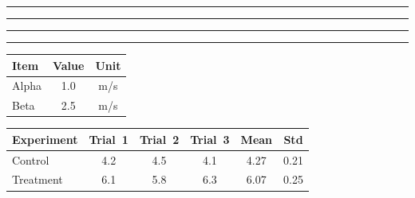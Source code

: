 \documentclass[twocolumn]{article}
\begin{document}
\begin{absfigure}[page=4, pos=t, col=1]
  \centering
  \rule{0.9\columnwidth}{2cm}
  \caption{Top stack A (defined first) --- page~4, col~1}
  \label{fig:topA}
\end{absfigure}

\begin{absfigure}[page=4, pos=t, col=1]
  \centering
  \rule{0.9\columnwidth}{1.5cm}
  \caption{Top stack B (defined second) --- page~4, col~1}
  \label{fig:topB}
\end{absfigure}

\begin{absfigure*}[page=3, pos=bottom]
  \centering
  \rule{0.9\textwidth}{3cm}
  \caption{Spanning absolute figure: page~3, bottom}
  \label{fig:p3spanbot}
\end{absfigure*}

\begin{absfigure}[page=end]
  \centering
  \rule{0.9\columnwidth}{3cm}
  \caption{Figure placed at the end of the document}
  \label{fig:end}
\end{absfigure}


\begin{abstable}[page=2, pos=b, col=1]
  \centering
  \caption{Absolute table: page~2, bottom, column~1}
  \label{tab:p2b1}
  \begin{tabular}{lcc}
    \hline
    Item & Value & Unit \\
    \hline
    Alpha & 1.0 & m/s \\
    Beta  & 2.5 & m/s \\
    \hline
  \end{tabular}
\end{abstable}

\begin{abstable*}[page=3, pos=t]
  \centering
  \caption{Spanning absolute table: page~3, top}
  \label{tab:p3span}
  \begin{tabular}{lccccc}
    \hline
    Experiment & Trial~1 & Trial~2 & Trial~3 & Mean & Std \\
    \hline
    Control    & 4.2     & 4.5     & 4.1     & 4.27 & 0.21 \\
    Treatment  & 6.1     & 5.8     & 6.3     & 6.07 & 0.25 \\
    \hline
  \end{tabular}
\end{abstable*}
\end{document}
